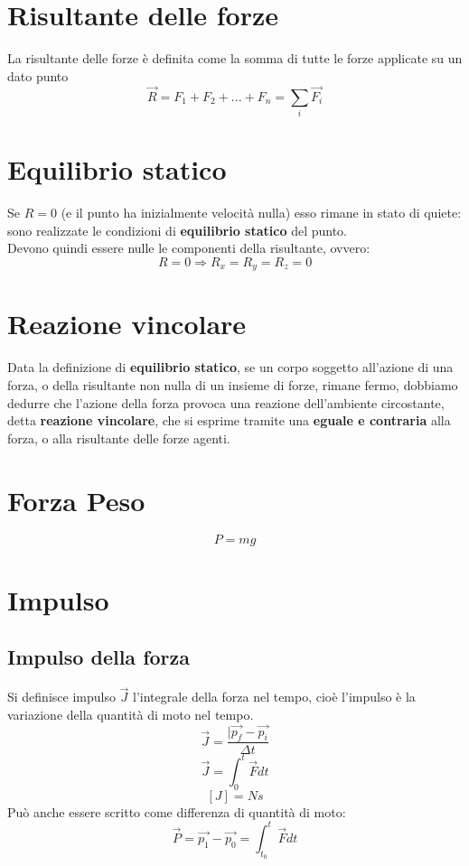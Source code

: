 \documentclass[a4paper]{report}
\begin{document}
  \section{Risultante delle forze}
  La risultante delle forze è definita come la somma di tutte le forze applicate su un dato punto
  $$ \vec{R} = F_1 + F_2 + ... + F_n = \sum_{i} \vec{F_i} $$

  \section{Equilibrio statico}
  Se $R = 0$ (e il punto ha inizialmente velocità nulla) esso rimane in stato di quiete: sono realizzate le condizioni di \textbf{equilibrio statico} del punto.\\
  Devono quindi essere nulle le componenti della risultante, ovvero:
  $$ R = 0 \Rightarrow R_x = R_y = R_z = 0 $$

  \section{Reazione vincolare}
  Data la definizione di \textbf{equilibrio statico}, se un corpo soggetto all'azione di una forza, o della risultante non nulla di un insieme di forze, rimane fermo, dobbiamo dedurre che l'azione della forza provoca una reazione dell'ambiente circostante, detta \textbf{reazione vincolare}, che si esprime tramite una \textbf{eguale e contraria} alla forza, o alla risultante delle forze agenti.

  \section{Forza Peso}
  $$ P = mg $$

  \section{Impulso}
  \subsection{Impulso della forza}
  Si definisce impulso $ \vec{J} $ l'integrale della forza nel tempo, cioè l'impulso è la variazione della quantità di moto nel tempo.
  $$ \vec{J} = \frac{|\vec{p_f} - \vec{p_i}}{\Delta t}$$
  $$ \vec{J} = \int_0^t \vec{F} dt $$
  $$ [J] = N  s $$
  Può anche essere scritto come differenza di quantità di moto:
  $$\vec{P} = \vec{p_1} - \vec{p_0} = \int_{t_0}^t \vec{F} dt $$
\end{document}
